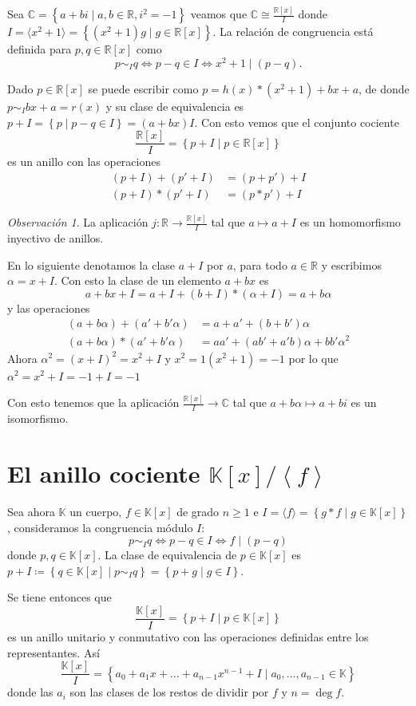 \documentclass[10pt, spanish]{report}
\theoremstyle{definition}
\theoremstyle{custom}
\theoremstyle{remark}
\newtheorem*{obs}{Observación}
\newcommand{\R}{\mathbb{R}}
\newcommand{\C}{\mathbb{C}}
\newcommand{\K}{\mathbb{K}}
\renewcommand{\geq}{\geqslant}
\begin{document}
Sea $\C =\left\{ a+bi\mid a,b\in\R, i^2 = -1 \right\}$ veamos que $\C\cong
\frac{\R[x]}{I}$ donde $I=\langle x^2 +1\rangle=\left\{(x^2+1)g\mid g\in\R[x]
\right\}$. La relación de congruencia está definida para $p,q\in\R[x]$ como
\[p\sim_I q \Leftrightarrow p-q\in I\Leftrightarrow x^2+1\mid(p-q).\]

Dado $p\in\R[x]$ se puede escribir como $p=h(x)*(x^2+1)+bx+a$, de donde
$p\sim_I bx+a=r(x)$ y su clase de equivalencia es $p+I=\left\{ p\mid p-q\in
I\right\}=(a+bx)I$. Con esto vemos que el conjunto cociente
\[\frac{\R[x]}{I}=\left\{ p+I\mid p\in\R[x] \right\} \]
es un anillo con las operaciones
\begin{align*}
    (p+I)+(p'+I)&=(p+p')+I\\
    (p+I)*(p'+I)&=(p*p')+I
\end{align*}

\begin{obs}
    La aplicación $j:\R\to\frac{\R[x]}{I}$ tal que $a\mapsto a+I$ es un
    homomorfismo inyectivo de anillos.
\end{obs}

En lo siguiente denotamos la clase $a+I$ por $a$, para todo $a\in\R$ y
escribimos $\alpha = x+I$. Con esto la clase de un elemento $a+bx$ es
\[a+bx+I=a+I+(b+I)*(\alpha+I)=a+b\alpha\]
y las operaciones
\begin{align*}
    (a+b\alpha)+(a'+b'\alpha)&=a+a'+(b+b')\alpha\\
    (a+b\alpha)*(a'+b'\alpha)&=aa'+(ab'+a'b)\alpha+bb'\alpha^2
\end{align*}
Ahora $\alpha^2=(x+I)^2=x^2+I$ y $x^2=1(x^2+1)=-1$ por lo que $\alpha^2=x^2+I
=-1+I=-1$

Con esto tenemos que la aplicación $\frac{\R[x]}{I}\to \C$ tal que
$a+b\alpha\mapsto a+bi$ es un isomorfismo.

\section{El anillo cociente $\K[x]/\left<f\right>$}

Sea ahora $\K$ un cuerpo, $f\in\K[x]$ de grado $n\geq 1$ e $I=\langle f\rangle=
\left\{ g*f\mid g\in\K[x] \right\}$, consideramos la congruencia módulo $I$:
\[p\sim_I q\Leftrightarrow p-q\in I \Leftrightarrow f\mid(p-q)\]
donde $p,q\in\K[x]$. La clase de equivalencia de $p\in\K[x]$ es $p+I\coloneqq
\left\{q\in\K[x]\mid p\sim_Iq\right\}=\left\{p+g\mid g\in I\right\}$.

Se tiene entonces que \[\frac{\K[x]}{I}=\left\{ p+I\mid p\in\K[x] \right\}\] es
un anillo unitario y conmutativo con las operaciones definidas entre los
representantes. Así \[\frac{\K[x]}{I}=\left\{ a_0+a_1x+\ldots+a_{n-1}x^{n-1}+
I\mid a_0,\ldots,a_{n-1}\in\K \right\}\] donde las $a_i$ son las clases de los
restos de dividir por $f$ y $n=\deg{f}$.
\end{document}
